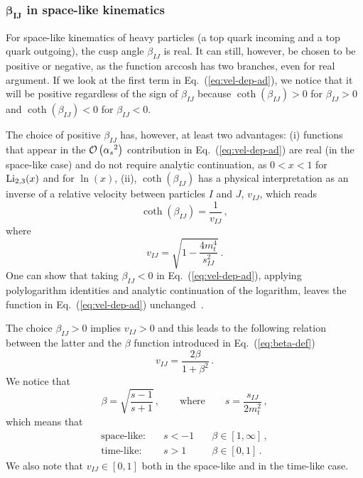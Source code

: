 \documentclass[a4paper,11pt]{report}
\numberwithin{equation}{section}
\newcommand{\betaIJ}{\beta_{IJ}}
\newcommand{\vIJ}{v_{IJ}}
\newcommand{\sIJ}{s_{IJ}}
\begin{document}
\subsubsection{$\mathbold{\betaIJ}$ in space-like kinematics}

For space-like kinematics of heavy particles (\eg a top quark incoming
and a top quark outgoing), the cusp angle $\beta_{IJ}$ is real. It
can still, however, be chosen to be positive or negative, as the function $\text{arccosh}$
has two branches, even for real argument. 
%
If we look at the first term in Eq.~(\ref{eq:vel-dep-ad}), we notice that it will
be positive regardless of the sign of $\beta_{IJ}$ because $\coth(\beta_{IJ}) >
0$ for $\betaIJ > 0$ and $\coth(\beta_{IJ}) < 0$ for $\betaIJ < 0$.
 
The choice of positive $\betaIJ$ has, however, at least two advantages: (i)
functions that appear in the ${{\cal O}\left({\alpha_s}^2\right)}$ contribution in
Eq.~(\ref{eq:vel-dep-ad}) are real (in the space-like case) and do not require
analytic continuation, as $0 < x < 1$ for $\mathrm{Li}_{2,3}(x)$ and for $\ln(x)$, (ii),
$\coth(\betaIJ)$ has a physical interpretation as an inverse of a relative
velocity between particles $I$ and $J$, $\vIJ$, which reads
%
\begin{equation}
  \coth(\betaIJ) = \frac{1}{\vIJ}\,,
  \label{eq:cothbetaIJ}
\end{equation}
%
where
%
\begin{equation}
  v_{IJ} = \sqrt{1- \frac{4 m_t^4}{s_{IJ}^2}}\,.
\end{equation}
%
One can show that taking $\betaIJ < 0$ in Eq.~(\ref{eq:vel-dep-ad}), applying
polylogarithm identities and analytic continuation of the logarithm, leaves the
function in Eq.~(\ref{eq:vel-dep-ad}) unchanged~\cite{AnalyticContinuation}.

The choice $\betaIJ>0$ implies $\vIJ > 0$ and this leads to the following
relation between the latter and the $\beta$ function introduced in
Eq.~(\ref{eq:beta-def})~\cite{MyNotes}
%
\begin{equation}
  \vIJ = \frac{2 \beta}{1+\beta^2}\,.
  \label{eq:vIJ-beta-rel}
\end{equation}
%
We notice that~\cite{MyNotes}
%
\begin{equation}
  \beta = \sqrt{\frac{s-1}{s+1}}\,, \qquad \text{where} \qquad 
  s = \frac{\sIJ}{2 m_t^2}\,,
\end{equation}
%
which means that
%
\begin{equation}
  \begin{array}{lll}
    \text{space-like:}\quad & s < -1 \quad & \beta \in [1,\infty]\,, \\[0.5em]
    \text{time-like:}\quad & s > 1 \quad & \beta \in [0,1]\,.
  \end{array}
\end{equation}
%
We also note that $\vIJ \in [0,1]$ both in the space-like and in the time-like
case.
\end{document}
